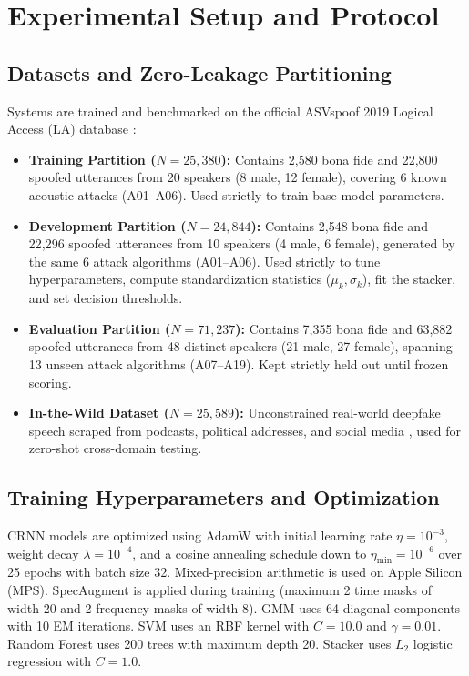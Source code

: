 \documentclass[conference]{IEEEtran}
\begin{document}
\section{Experimental Setup and Protocol}

\subsection{Datasets and Zero-Leakage Partitioning}
Systems are trained and benchmarked on the official ASVspoof 2019 Logical Access (LA) database \cite{wang2020asvspoof}:
\begin{itemize}
    \item \textbf{Training Partition ($N = 25{,}380$):} Contains 2,580 bona fide and 22,800 spoofed utterances from 20 speakers (8 male, 12 female), covering 6 known acoustic attacks (A01--A06). Used strictly to train base model parameters.
    \item \textbf{Development Partition ($N = 24{,}844$):} Contains 2,548 bona fide and 22,296 spoofed utterances from 10 speakers (4 male, 6 female), generated by the same 6 attack algorithms (A01--A06). Used strictly to tune hyperparameters, compute standardization statistics ($\mu_k, \sigma_k$), fit the stacker, and set decision thresholds.
    \item \textbf{Evaluation Partition ($N = 71{,}237$):} Contains 7,355 bona fide and 63,882 spoofed utterances from 48 distinct speakers (21 male, 27 female), spanning 13 unseen attack algorithms (A07--A19). Kept strictly held out until frozen scoring.
    \item \textbf{In-the-Wild Dataset ($N = 25{,}589$):} Unconstrained real-world deepfake speech scraped from podcasts, political addresses, and social media \cite{muller2022does}, used for zero-shot cross-domain testing.
\end{itemize}

\subsection{Training Hyperparameters and Optimization}
CRNN models are optimized using AdamW \cite{loshchilov2019decoupled} with initial learning rate $\eta = 10^{-3}$, weight decay $\lambda = 10^{-4}$, and a cosine annealing schedule down to $\eta_{\min} = 10^{-6}$ over 25 epochs with batch size 32. Mixed-precision arithmetic is used on Apple Silicon (MPS). SpecAugment \cite{park2019specaugment} is applied during training (maximum 2 time masks of width 20 and 2 frequency masks of width 8). GMM uses 64 diagonal components with 10 EM iterations. SVM uses an RBF kernel with $C=10.0$ and $\gamma=0.01$. Random Forest uses 200 trees with maximum depth 20. Stacker uses $L_2$ logistic regression with $C=1.0$.
\end{document}
